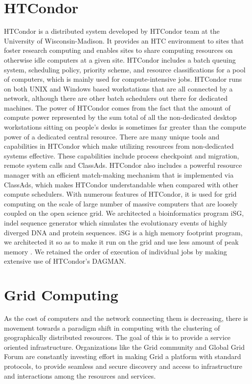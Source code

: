 \documentclass[ms,electronic,double]{nuthesis}
\begin{document}
\section{HTCondor} HTCondor is a distributed system developed by HTCondor team at the 
University of Wisconsin-Madison. It provides an HTC environment to sites 
that foster research computing and enables sites to share computing resources on otherwise  
idle computers at a given site. HTCondor includes a batch queuing 
system, scheduling policy, priority scheme, and resource classifications for a pool of 
computers, which is mainly used for compute-intensive jobs. HTCondor runs on both
 UNIX and Windows based workstations that are all connected by a network, although there are other batch schedulers out there for dedicated machines. 
The power of HTCondor comes from  the fact that  the amount of compute power 
represented by the sum total of all the 
 non-dedicated desktop workstations sitting on people's desks is sometimes far 
 greater than the compute power of a dedicated central resource. There are many 
 unique tools and capabilities in HTCondor which make utilizing resources from 
 non-dedicated systems effective. These capabilities include process checkpoint 
 and migration, remote system calls and ClassAds. HTCondor also includes a 
 powerful resource manager with an efficient match-making mechanism that is 
 implemented via ClassAds, which makes HTCondor understandable when compared with other 
 compute schedulers\cite{manual56}. With numerous features of HTCondor, it is 
 used for grid computing on the scale of large number of massive computers 
 that are loosely coupled on the open science grid. We architected a 
 bioinformatics program iSG, indel sequence generator which simulates the evolutionary events of highly diverged DNA and protein 
 sequences. iSG is a high memory footprint program, we architected it so as to 
 make it run on the grid and use less amount of peak memory \cite{condorisg_paper}. 
 We retained the order of execution of individual jobs 
 by making extensive use of HTCondor's DAGMAN.
 
 
\section{Grid Computing}

As the cost of computers and the network connecting them is decreasing, there is movement towards a 
paradigm shift in computing with the clustering of geographically distributed 
resources. The goal of this is to provide a 
service oriented infrastructure. Organizations like the Grid community and Global Grid Forum are constantly investing effort in making Grid a platform with standard 
protocols, to provide seamless and secure discovery and access to infrastructure and interactions among
 the resources and services.
 
\end{document}
